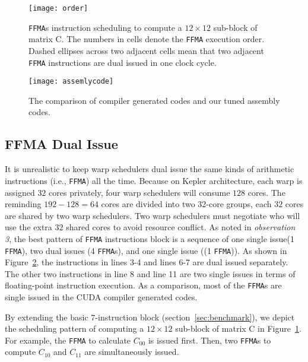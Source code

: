 \begin{figure}[htbp]
\begin{center}
\texttt{[image: order]}
\caption{\small {\tt FFMA}s instruction scheduling to compute a $12\times 12$ sub-block of matrix C.  The numbers in
cells denote the {\tt FFMA} execution order. Dashed ellipses across two adjacent cells mean that two adjacent {\tt FFMA} instructions are dual issued in one clock cycle.}
\label{fig:order}
\end{center}
\end{figure}

\begin{figure}[htbp]
\begin{center}
\texttt{[image: assemlycode]}
    \caption{\small The comparison of compiler generated codes and our tuned assembly codes.}
\label{fig:assemblycode}
\end{center}
\end{figure}
\subsection{FFMA Dual Issue}
\label{sec:ffma-dual}

It is unrealistic to keep warp schedulers dual issue the same kinds of arithmetic instructions (i.e., {\tt FFMA}) all
the time. Because on Kepler architecture, each warp is assigned $32$ cores privately, four warp schedulers will consume
$128$ cores. The reminding $192-128=64$ cores are divided into two 32-core groups, each $32$ cores
are shared by two warp schedulers. Two warp schedulers must negotiate who will use the extra $32$ shared cores to avoid
resource conflict.
As noted in {\em observation 3}, the best pattern of {\tt FFMA} instructions block is a sequence of one single issue(1
{\tt FFMA}), two dual issues (4 {\tt FFMA}s), and one single issue ((1 {\tt FFMA})). As shown in
Figure~\ref{fig:assemblycode}, the instructions in lines 3-4 and lines 6-7 are dual issued separately.
The other two instructions in line 8 and line 11 are two single issues in terms of floating-point instruction
execution.
As a comparison, most of the {\tt FFMA}s are single issued in the CUDA compiler generated codes.

By extending the basic $7$-instruction block (section~\ref{sec:benchmark}), we depict the scheduling pattern of computing a $12\times 12$ sub-block of matrix C in Figure~\ref{fig:order}.
For example, the {\tt FFMA} to calculate $C_{00}$ is issued first.
Then, two {\tt FFMA}s to
compute $C_{10}$ and $C_{11}$ are simultaneously issued. %

